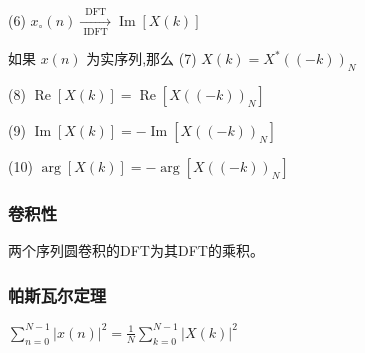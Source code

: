 \documentclass{../source/Experiment}
\begin{document}
(6) $x_{\circ}(n) \underset{\text { IDFT }}{\stackrel{\text { DFT }}{\longrightarrow}} \operatorname{Im}[X(k)]$

如果 $x(n)$ 为实序列,那么
(7) $X(k)=X^{*}((-k))_{N}$

(8) $\operatorname{Re}[X(k)]=\operatorname{Re}\left[X((-k))_{N}\right]$

(9) $\operatorname{Im}[X(k)]=-\operatorname{Im}\left[X((-k))_{N}\right]$

(10) $\arg [X(k)]=-\arg \left[X((-k))_{N}\right]$
\subsubsection{卷积性}
两个序列圆卷积的DFT为其DFT的乘积。
\subsubsection{帕斯瓦尔定理}
$\sum_{n=0}^{N-1}|x(n)|^{2}=\frac{1}{N} \sum_{k=0}^{N-1}|X(k)|^{2}$
\end{document}
